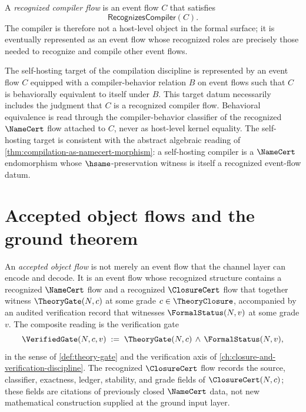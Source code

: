 \begin{definition}
\label{def:ground-event-flow-recognized-compiler-flow}
A \emph{recognized compiler flow} is an event flow $C$ that satisfies
$$
  \mathsf{RecognizesCompiler}(C).
$$
The compiler is therefore not a host-level object in the formal surface; it is eventually represented as an event flow whose recognized roles are precisely those needed to recognize and compile other event flows.
\end{definition}

\begin{principle}
\label{prin:ground-event-flow-self-hosting-target}
The self-hosting target of the compilation discipline is represented by an event flow $C$ equipped with a compiler-behavior relation $B$ on event flows such that $C$ is behaviorally equivalent to itself under $B$. This target datum necessarily includes the judgment that $C$ is a recognized compiler flow. Behavioral equivalence is read through the compiler-behavior classifier of the recognized $\NameCert$ flow attached to $C$, never as host-level kernel equality. The self-hosting target is consistent with the abstract algebraic reading of \autoref{thm:compilation-as-namecert-morphism}: a self-hosting compiler is a $\NameCert$ endomorphism whose $\hsame$-preservation witness is itself a recognized event-flow datum.
\end{principle}

\section{Accepted object flows and the ground theorem}
\label{sec:ground-event-flow-accept-and-ground-theorem}

\begin{definition}
\label{def:ground-event-flow-accepted-object-flow}
An \emph{accepted object flow} is not merely an event flow that the channel layer can encode and decode. It is an event flow whose recognized structure contains a recognized $\NameCert$ flow and a recognized $\ClosureCert$ flow that together witness $\TheoryGate(N, c)$ at some grade $c \in \TheoryClosure$, accompanied by an audited verification record that witnesses $\FormalStatus(N, v)$ at some grade $v$. The composite reading is the verification gate
$$
  \VerifiedGate(N, c, v) \;:=\; \TheoryGate(N, c) \,\wedge\, \FormalStatus(N, v),
$$
in the sense of \autoref{def:theory-gate} and the verification axis of \autoref{ch:closure-and-verification-discipline}. The recognized $\ClosureCert$ flow records the source, classifier, exactness, ledger, stability, and grade fields of $\ClosureCert(N, c)$; these fields are citations of previously closed $\NameCert$ data, not new mathematical construction supplied at the ground input layer.
\end{definition}

